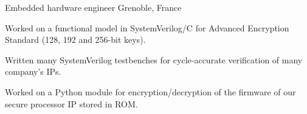 
\begin{cventries}
\vspace{-5mm}

\cventry
{}
{\vspace{-9mm}Embedded hardware engineer } %
{\vspace{-9mm}Grenoble, France} %
{} %
{
\begin{cvitems}
\item{Worked on a functional model in SystemVerilog/C for Advanced Encryption 
Standard (128, 192 and 256-bit keys).}
\item{Written many SystemVerilog testbenches for cycle-accurate verification of 
many company's IPs.}
\item{Worked on a Python module for encryption/decryption of the firmware of 
our secure processor IP stored in ROM.}
\end{cvitems}
}
\vspace{-5mm}


\end{cventries}
